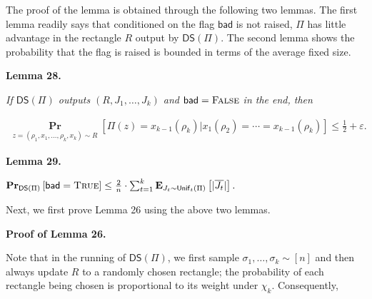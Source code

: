 \documentclass[10pt,a4paper]{article}
\begin{document}
The proof of the lemma is obtained through the following two lemmas.
The first lemma readily says that conditioned on the flag $\mathsf{bad}$ is not raised, $\Pi$ has little advantage in the rectangle $R$ output by $\mathsf{DS}(\Pi)$.
The second lemma shows the probability that the flag is raised is bounded in terms of the average fixed size.\par





\par\medskip\noindent\textbf{
\textbf{Lemma 28}\textbf{.}
}\par



\emph{If $\mathsf{DS}(\Pi)$ outputs $(R,J_{1},\dots,J_{k})$ and $\mathsf{bad}=\textsc{False}$ in the end, then}\par


\[\begin{gathered}
\operatorname*{\mathbf{Pr}}_{z=(\rho_{1},x_{1},\dots,\rho_{k},x_{k})\sim R}\left[\Pi(z)=x_{k-1}(\rho_{k})|x_{1}(\rho_{2})=\cdots=x_{k-1}(\rho_{k})\right]\leq\frac{1}{2}+\varepsilon.
\end{gathered}\]







\par\medskip\noindent\textbf{
\textbf{Lemma 29}\textbf{.}
}\par



$\operatorname*{\mathbf{Pr}}_{\mathsf{DS}(\Pi)}\left[\mathsf{bad}=\textsc{True}\right]\leq\frac{2}{n}\cdot\sum_{t=1}^{k}\operatorname*{\mathbf{E}}_{J_{t}\sim\mathsf{Unif}_{t}(\Pi)}\left[|\overline{J_{t}}|\right].$\emph{}\par






Next, we first prove Lemma 26 using the above two lemmas.\par




\par\medskip\noindent\textbf{Proof of Lemma 26.}\par




Note that in the running of $\mathsf{DS}(\Pi)$,
we first sample $\sigma_{1},\dots,\sigma_{k}\sim[n]$ and then
always update $R$ to a randomly chosen rectangle; the probability of each rectangle being chosen is proportional to its weight under $\chi_{k}$.
Consequently,\par
\end{document}
